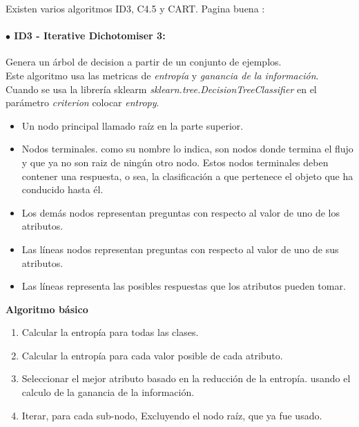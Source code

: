 \documentclass[../main.tex]{subfiles}
\begin{document}
            Existen varios algoritmos ID3, C4.5 y CART. Pagina buena \cite{tree_pag}:


            
            \paragraph{$\bullet$ ID3 - Iterative Dichotomiser 3:}
                Genera un árbol de decision a partir de un conjunto de ejemplos.\\
                Este algoritmo usa las metricas de \textit{entropía} y \textit{ganancia de la información}. Cuando se usa la librería sklearm \textit{sklearn.tree.DecisionTreeClassifier} en el parámetro \textit{criterion} colocar \textit{entropy}.
                
                \begin{itemize}
                    \item Un nodo principal llamado raíz en la parte superior.
                    \item Nodos terminales. como su nombre lo indica, son nodos donde termina el flujo y que ya no son raiz de ningún otro nodo. Estos nodos terminales deben contener una respuesta, o sea, la clasificación a que pertenece el objeto que ha conducido hasta él.
                    \item Los demás nodos representan preguntas con respecto al valor de uno de los atributos.
                    \item Las líneas nodos representan preguntas con respecto al valor de uno de sus atributos.
                    \item Las líneas representa las posibles respuestas que los atributos pueden tomar.
                \end{itemize}
        
                \textbf{Algoritmo básico}
                \begin{enumerate}
                    \item Calcular la entropía para todas las clases.
                    \item Calcular la entropía para cada valor posible de cada atributo.
                    \item Seleccionar el mejor atributo basado en la reducción de la entropía. usando el calculo de la ganancia de la información.
                    \item Iterar, para cada sub-nodo, Excluyendo el nodo raíz, que ya fue usado.
                \end{enumerate}
            
\end{document}
